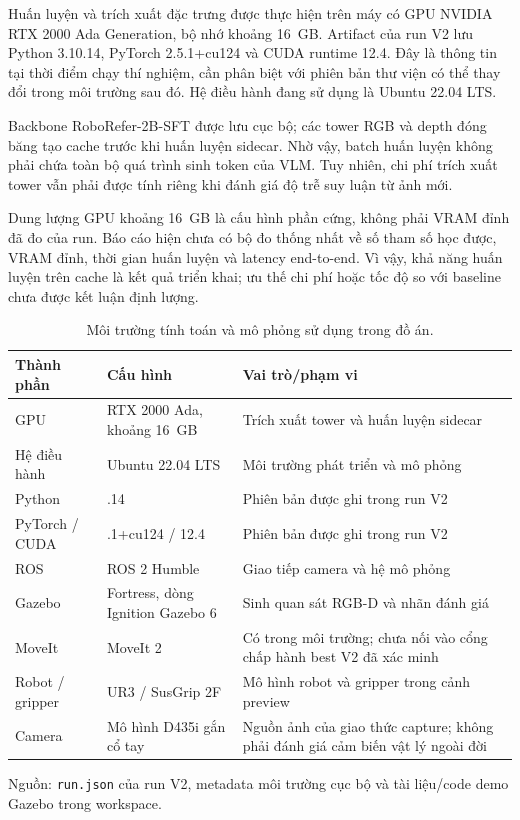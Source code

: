 Huấn luyện và trích xuất đặc trưng được thực hiện trên máy có GPU
NVIDIA RTX 2000 Ada Generation, bộ nhớ khoảng 16~GB.
Artifact của run V2 lưu Python 3.10.14, PyTorch 2.5.1+cu124 và CUDA
runtime 12.4. Đây là thông tin tại thời điểm chạy thí nghiệm, cần
phân biệt với phiên bản thư viện có thể thay đổi trong môi trường
sau đó. Hệ điều hành đang sử dụng là Ubuntu 22.04 LTS.

Backbone RoboRefer-2B-SFT được lưu cục bộ; các tower RGB và depth
đóng băng tạo cache trước khi huấn luyện sidecar. Nhờ vậy, batch
huấn luyện không phải chứa toàn bộ quá trình sinh token của VLM.
Tuy nhiên, chi phí trích xuất tower vẫn phải được tính riêng khi
đánh giá độ trễ suy luận từ ảnh mới.

Dung lượng GPU khoảng 16~GB là cấu hình phần cứng, không phải VRAM đỉnh
đã đo của run. Báo cáo hiện chưa có bộ đo thống nhất về số tham số học
được, VRAM đỉnh, thời gian huấn luyện và latency end-to-end. Vì vậy,
khả năng huấn luyện trên cache là kết quả triển khai; ưu thế chi phí
hoặc tốc độ so với baseline chưa được kết luận định lượng.

\begin{table}[htbp]
    \centering
    \setlength{\tabcolsep}{4pt}
    \renewcommand{\arraystretch}{1.15}
    \caption{Môi trường tính toán và mô phỏng sử dụng trong đồ án.}
    \label{tab:setup-environment}
    \small
    \begin{tabularx}{\textwidth}{@{}>{\raggedright\arraybackslash}p{}>{\raggedright\arraybackslash}p{}>{\raggedright\arraybackslash}X@{}}
        \toprule
        Thành phần & Cấu hình & Vai trò/phạm vi \\
        \midrule
        GPU & RTX 2000 Ada, khoảng 16~GB &
        Trích xuất tower và huấn luyện sidecar \\
        Hệ điều hành & Ubuntu 22.04 LTS &
        Môi trường phát triển và mô phỏng \\
        Python & 3.10.14 & Phiên bản được ghi trong run V2 \\
        PyTorch / CUDA & 2.5.1+cu124 / 12.4 &
        Phiên bản được ghi trong run V2 \\
        ROS & ROS 2 Humble & Giao tiếp camera và hệ mô phỏng \\
        Gazebo & Fortress, dòng Ignition Gazebo 6 &
        Sinh quan sát RGB-D và nhãn đánh giá \\
        MoveIt & MoveIt 2 & Có trong môi trường; chưa nối vào
        cổng chấp hành best V2 đã xác minh \\
        Robot / gripper & UR3 / SusGrip 2F &
        Mô hình robot và gripper trong cảnh preview \\
        Camera & Mô hình D435i gắn cổ tay &
        Nguồn ảnh của giao thức capture; không phải đánh giá
        cảm biến vật lý ngoài đời \\
        \bottomrule
    \end{tabularx}
    \vspace{2pt}
    {\footnotesize\raggedright Nguồn: \texttt{run.json} của run V2, metadata môi
    trường cục bộ và tài liệu/code demo Gazebo trong workspace.\par}
\end{table}

